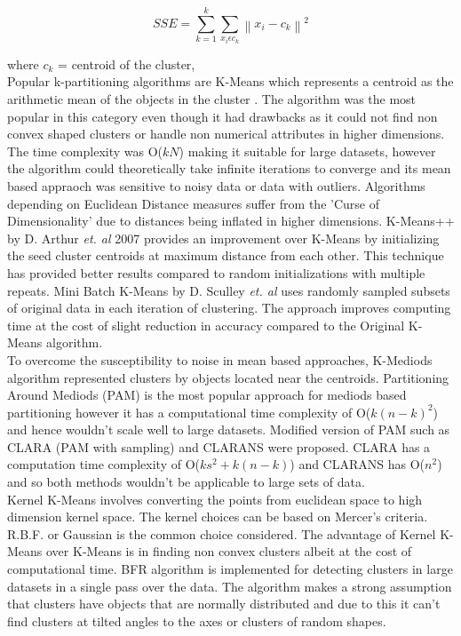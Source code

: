 \begin{equation}
SSE = \sum_{k=1}^{k} \sum_{x_i \epsilon c_k} \left \| x_i - c_k \right \| ^2
\end{equation}

where $c_k$ = centroid of the cluster,\\

Popular k-partitioning algorithms are K-Means which represents a centroid as the arithmetic mean of the objects in the cluster \cite{aps:38}. The algorithm was the most popular in this category even though it had drawbacks as it could not find non convex shaped clusters or handle non numerical attributes in higher dimensions. The time complexity was O($kN$) making it suitable for large datasets, however the algorithm could theoretically take infinite iterations to converge and its mean based appraoch was sensitive to noisy data or data with outliers. Algorithms depending on Euclidean Distance measures suffer from the 'Curse of Dimensionality' due to distances being inflated in higher dimensions. K-Means++ by D. Arthur \textit{et. al} 2007 \cite{aps:39} provides an improvement over K-Means by initializing the seed cluster centroids at maximum distance from each other. This technique has provided better results compared to random initializations with multiple repeats. Mini Batch K-Means by D. Sculley \textit{et. al} \cite{aps:40} uses randomly sampled subsets of original data in each iteration of clustering. The approach improves computing time at the cost of slight reduction in accuracy compared to the Original K-Means algorithm.\\

To overcome the susceptibility to noise in mean based approaches, K-Mediods algorithm represented clusters by objects located near the centroids. Partitioning Around Mediods (PAM) \cite{aps:38} is the most popular approach for mediods based partitioning however it has a computational time complexity of O($k(n-k)^2$) and hence wouldn't scale well to large datasets. Modified version of PAM such as CLARA (PAM with sampling) \cite{aps:39} and CLARANS \cite{aps:40} were proposed. CLARA has a computation time complexity of O($ks^2 + k(n-k)$) and CLARANS has O($n^2$) and so both methods wouldn't be applicable to large sets of data. \\

Kernel K-Means involves converting the points from euclidean space to high dimension kernel space. The kernel choices can be based on Mercer's criteria. R.B.F. or Gaussian is the common choice considered. The advantage of Kernel K-Means over K-Means is in finding non convex clusters albeit at the cost of computational time. BFR algorithm \cite{aps:41} is implemented for detecting clusters in large datasets in a single pass over the data. The algorithm makes a strong assumption that clusters have objects that are normally distributed and due to this it can't find clusters at tilted angles to the axes or clusters of random shapes.      
 

